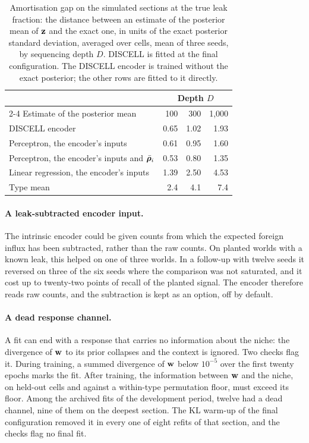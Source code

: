 \begin{table}[t]
\centering
\caption{Amortisation gap on the simulated sections at the true leak fraction: the distance between an estimate of the posterior mean of $\mathbf{z}$ and the exact one, in units of the exact posterior standard deviation, averaged over cells, mean of three seeds, by sequencing depth $D$. DISCELL is fitted at the final configuration. The DISCELL encoder is trained without the exact posterior; the other rows are fitted to it directly.}
\label{tab:planted-gap}
\small
\begin{tabular}{@{}lrrr@{}}
\toprule
& \multicolumn{3}{c}{Depth $D$} \\
\cmidrule(l){2-4}
Estimate of the posterior mean & 100 & 300 & 1{,}000 \\
\midrule
DISCELL encoder & 0.65 & 1.02 & 1.93 \\
Perceptron, the encoder's inputs & 0.61 & 0.95 & 1.60 \\
Perceptron, the encoder's inputs and $\bar{\boldsymbol{\rho}}_i$ & 0.53 & 0.80 & 1.35 \\
Linear regression, the encoder's inputs & 1.39 & 2.50 & 4.53 \\
Type mean & 2.4 & 4.1 & 7.4 \\
\bottomrule
\end{tabular}
\end{table}

\paragraph{A leak-subtracted encoder input.}
 The intrinsic encoder could be given counts from which the expected foreign influx has been subtracted, rather than the raw counts. On planted worlds with a known leak, this helped on one of three worlds. In a follow-up with twelve seeds it reversed on three of the six seeds where the comparison was not saturated, and it cost up to twenty-two points of recall of the planted signal. The encoder therefore reads raw counts, and the subtraction is kept as an option, off by default.

\paragraph{A dead response channel.}
 A fit can end with a response that carries no information about the niche: the divergence of $\mathbf{w}$ to its prior collapses and the context is ignored. Two checks flag it. During training, a summed divergence of $\mathbf{w}$ below $10^{-5}$ over the first twenty epochs marks the fit. After training, the information between $\mathbf{w}$ and the niche, on held-out cells and against a within-type permutation floor, must exceed its floor. Among the archived fits of the development period, twelve had a dead channel, nine of them on the deepest section. The KL warm-up of the final configuration removed it in every one of eight refits of that section, and the checks flag no final fit.

